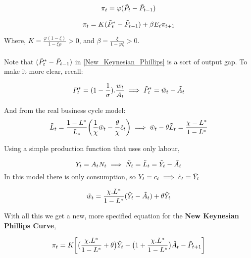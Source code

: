 \begin{equation*}
\begin{aligned}
    \pi_{t}=\varphi(\Tilde{P}_{t}-\Tilde{P}_{t-1}) \\ 
\end{aligned}
\end{equation*}

\begin{equation} \label{New_Keynesian_Phillips}
    \pi_{t}= K(\Tilde{P}_{t}^{*}-\Tilde{P}_{t-1})+\beta E_{t}\pi_{t+1}
\end{equation}

Where, $ K=\frac{\varphi(1-\xi)}{1-\xi \rho} > 0$, and $\beta = \frac{\xi}{1-\varphi \xi} > 0$.

\paragraph{}
Note that $(\Tilde{P}_{t}^{*}-\Tilde{P}_{t-1})$ in \ref{New_Keynesian_Phillips} is a sort of output gap. To make it more clear, recall: 

\begin{equation*}
    P_{t}^{*}=(1-\frac{1}{\sigma}).\frac{w_{t}}{A_{t}} \implies\Tilde{P}_{t}^{*}=\Tilde{w}_{t}-\Tilde{A}_{t}
\end{equation*}

And from the real business cycle model: 
\begin{equation*}
    \Tilde{L}_{t}=\frac{1-L^{*}}{L_{*}}\bigg(\frac{1}{\chi}\Tilde{w}_{t}-\frac{\theta}{\chi}\Tilde{c}_{t}\bigg) \implies \Tilde{w}_{t}-\theta\Tilde{L}_{t}=\frac{\chi-L^{*}}{1-L^{*}}
\end{equation*}

Using a simple production function that uses only labour, 

\begin{equation*}
    Y_{t}=A_{t}N_{t} \implies \Tilde{N}_{t}=\Tilde{L}_{t}=\Tilde{Y}_{t}-\Tilde{A}_{t}
\end{equation*}
In this model there is only consumption, so $Y_{t}=c_{t} \implies \Tilde{c}_{t}=\Tilde{Y}_{t}$

\begin{equation*}
    \Tilde{w}_{t}=\frac{\chi.L^{*}}{1-L^{*}}(\Tilde{Y}_{t}-\Tilde{A}_{t})+\theta\Tilde{Y}_{t}
\end{equation*}

With all this we get a new, more specified equation for the \textbf{New Keynesian Phillips Curve}, 

\begin{equation}
    \pi_{t}=K\bigg[\big(\frac{\chi.L^{*}}{1-L^{*}}+\theta \big)\Tilde{Y}_{t}-\big(1+\frac{\chi.L^{*}}{1-L^{*}} \big)\Tilde{A}_{t}-\Tilde{P}_{t+1}\bigg]
\end{equation}

